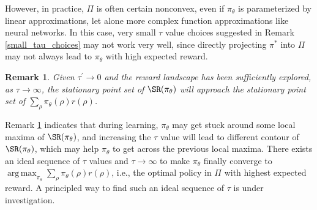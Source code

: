 \documentclass{article}
\newtheorem{remk}{Remark}
\DeclareMathOperator*{\argmax}{arg\,max}
\begin{document}
However, in practice, $\Pi$ is often certain nonconvex, even if $\pi_\theta$ is parameterized by linear approximations, let alone more complex function approximations like neural networks. In this case, very small $\tau$ value choices suggested in Remark \ref{small_tau_choices} may not work very well, since directly projecting $\pi^*$ into $\Pi$ may not always lead to $\pi_\theta$ with high expected reward.
 
\begin{remk}
\label{large_tau_choices}
Given $\tau^{\prime} \to 0$ and the reward landscape has been sufficiently explored, as $\tau \to \infty$, the stationary point set of $\SR(\pi_\theta)$ will approach the stationary point set of $\sum_{\rho}{ \pi_\theta(\rho) r(\rho) }$.
\end{remk}

Remark \ref{large_tau_choices} indicates that during learning, $\pi_\theta$ may get stuck around some local maxima of $\SR(\pi_\theta)$, and increasing the $\tau$ value will lead to different contour of $\SR(\pi_\theta)$, which may help $\pi_\theta$ to get across the previous local maxima. There exists an ideal sequence of $\tau$ values and $\tau \to \infty$ to make $\pi_\theta$ finally converge to $\argmax_{\pi_\theta}{ \sum_{\rho}{\pi_\theta(\rho) r(\rho)} }$, i.e., the optimal policy in $\Pi$ with highest expected reward. A principled way to find such an ideal sequence of $\tau$ is under investigation.
\fi
\end{document}
